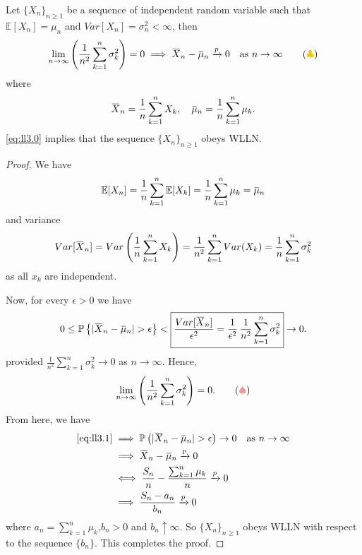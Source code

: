 \begin{theorem}
    Let $\{X_n \}_{n \geq 1}$ be a sequence of independent random variable such that 
    $\mathbb{E}[X_n] = \mu_n$ and $Var[X_n] = \sigma^2_n < \infty$, then
    \begin{equation}
        \lim_{n \to \infty} \left( \frac{1}{n^2} \sum^n_{k=1} \sigma^2_k \right) = 0 
        \implies \ols{X}_n - \ols{\mu}_n \xrightarrow[]{p} 0 \quad \text{as } n \to \infty \label{eq:ll3.0} \tag{{\color{myyellow} $\clubsuit $}}
    \end{equation}
    where 
    \begin{equation}
        \ols{X}_n = \frac{1}{n} \sum^n_{k=1} X_k, \quad \ols{\mu}_n = \frac{1}{n} \sum^n_{k=1} \mu_k.
    \end{equation}
    \eqref{eq:ll3.0} implies that the sequence $\{X_n \}_{n \geq 1}$ obeys WLLN.
\end{theorem}
\begin{proof}
    We have
    \begin{equation}
        \mathbb{E}[X_n] = \frac{1}{n} \sum^n_{k=1} \mathbb{E}[X_k] = \frac{1}{n} \sum^n_{k=1} \mu_k = \ols{\mu}_n
    \end{equation}
    and variance
    \begin{equation}
        Var[\ols{X}_n] = Var \left( \frac{1}{n} \sum^n_{k=1} X_k \right) = \frac{1}{n^2} \sum^n_{k=1} Var(X_k)
        = \frac{1}{n} \sum^n_{k=1} \sigma^2_k
    \end{equation}
    as all $x_k$ are independent.

    Now, for every $\epsilon > 0$ we have
    \begin{equation}
        0 \leq \mathbb{P} \left\{ |\ols{X}_n - \ols{\mu}_n | > \epsilon \right\} < 
        \fbox{$\displaystyle \frac{Var[\ols{X}_n]}{\epsilon^2} = \frac{1}{\epsilon^2} \, \frac{1}{n^2} \sum^n_{k=1} \sigma^2_k$} \to 0.
    \end{equation}
    provided $\frac{1}{n^2} \sum^n_{k=1} \sigma^2_k \to 0$ as $n \to \infty$. Hence,
    \begin{equation}
        \lim_{n \to \infty} \left( \frac{1}{n^2} \sum^n_{k=1} \sigma^2_k \right) = 0. \label{eq:ll3.1} \tag{{\color{myred} $\spadesuit $}}
    \end{equation}
    From here, we have
    \begin{align*}
        \eqref{eq:ll3.1} &\implies \mathbb{P} \left(|\ols{X}_n - \ols{\mu}_n | > \epsilon \right) \to 0 \quad \text{as } n \to \infty\\
        &\implies \ols{X}_n - \ols{\mu}_n \xrightarrow[]{p} 0\\
        &\iff \frac{S_n}{n} - \frac{\sum^n_{k=1} \mu_k}{n} \xrightarrow[]{p} 0\\
        &\implies \frac{S_n - a_n}{b_n} \xrightarrow[]{p} 0
    \end{align*}
    where $a_n = \sum_{k=1}^{n} \mu_k$,\quad $b_n > 0$ and $b_n \uparrow \infty$. So 
     $\{X_n \}_{n \geq 1}$ obeys WLLN with respect to the sequence $\{b_n\}$. This completes the proof.
\end{proof}

